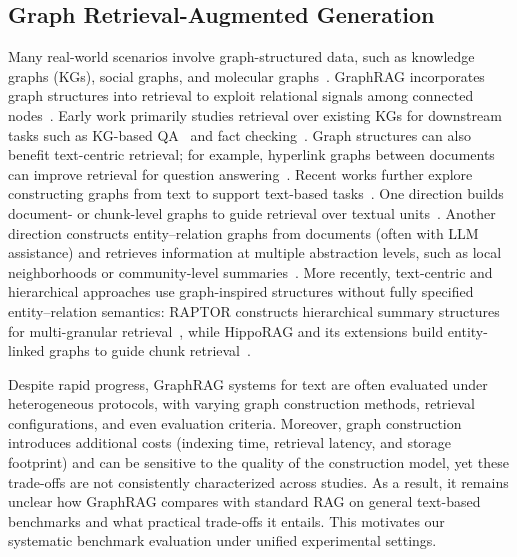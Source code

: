 \subsection{Graph Retrieval-Augmented Generation}
Many real-world scenarios involve graph-structured data, such as knowledge graphs (KGs), social graphs, and molecular graphs~\cite{xia2021graph, ma2021deep}. 
GraphRAG incorporates graph structures into retrieval to exploit relational signals among connected nodes~\cite{han2024retrieval, peng2024graph}. 
Early work primarily studies retrieval over existing KGs for downstream tasks such as KG-based QA~\cite{tian2024graph, yasunaga2021qa} and fact checking~\cite{kim2023factkg}. 
Graph structures can also benefit text-centric retrieval; for example, hyperlink graphs between documents can improve retrieval for question answering~\cite{li2022dynamic}.
Recent works further explore constructing graphs from text to support text-based tasks~\cite{han2024retrieval}. 
One direction builds document- or chunk-level graphs to guide retrieval over textual units~\cite{dong2024don, li2022dynamic}. 
Another direction constructs entity--relation graphs from documents (often with LLM assistance) and retrieves information at multiple abstraction levels, such as local neighborhoods or community-level summaries~\cite{edge2024local, han2025reasoning}. 
More recently, text-centric and hierarchical approaches use graph-inspired structures without fully specified entity--relation semantics: RAPTOR constructs hierarchical summary structures for multi-granular retrieval~\cite{sarthi2024raptor}, while HippoRAG and its extensions build entity-linked graphs to guide chunk retrieval~\cite{jimenez2024hipporag, gutierrez2025rag}. 

Despite rapid progress, GraphRAG systems for text are often evaluated under heterogeneous protocols, with varying graph construction methods, retrieval configurations, and even evaluation criteria. 
Moreover, graph construction introduces additional costs (indexing time, retrieval latency, and storage footprint) and can be sensitive to the quality of the construction model, yet these trade-offs are not consistently characterized across studies. 
As a result, it remains unclear how GraphRAG compares with standard RAG on general text-based benchmarks and what practical trade-offs it entails. This motivates our systematic benchmark evaluation under unified experimental settings.
